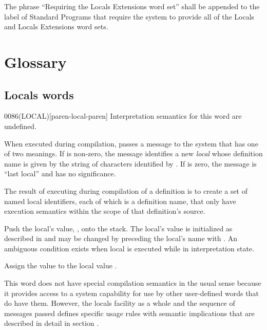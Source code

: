 The phrase ``Requiring the Locals Extensions word set'' shall be
appended to the label of Standard Programs that require the system
to provide all of the Locals and Locals Extensions word sets.


\section{Glossary} %

\subsection{Locals words} %


\enlargethispage{4ex}
\begin{worddef}[LOCAL]{0086}{(LOCAL)}[paren-local-paren]
\interpret
	Interpretation semantics for this word are undefined.

\execute

	When executed during compilation,  passes a
	message to the system that has one of two meanings. If 
	is non-zero, the message identifies a new \emph{local} whose
	definition name is given by the string of characters identified
	by . If  is zero, the message is ``last
	local'' and  has no significance.

	The result of executing  during compilation of a
	definition is to create a set of named local identifiers, each
	of which is a definition name, that only have execution
	semantics within the scope of that definition's source.

\execute[local]

	Push the local's value, , onto the stack. The local's
	value is initialized as described in  and may be changed by preceding the local's
	name with . An ambiguous condition exists when local is
	executed while in interpretation state.

 

	Assign the value  to the local value .

\note
	This word does not have special compilation semantics in the
	usual sense because it provides access to a system capability
	for use by other user-defined words that do have them. However,
	the locals facility as a whole and the sequence of messages
	passed defines specific usage rules with semantic implications
	that are described in detail in section
	.


\end{worddef}
